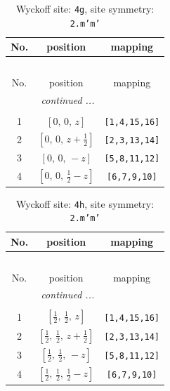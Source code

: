 \documentclass[fleqn,8pt]{jsarticle}
\begin{document}
\renewcommand{\arraystretch}{1.2}
\begin{longtable}{ccc}
\caption{Wyckoff site: {\tt 4g}, site symmetry: {\tt 2.m'm'}}
 \\
 \hline \hline
No. & position & mapping \\ \hline \endfirsthead

\multicolumn{2}{l}{\tablename\ \thetable{}} \\
 \hline \hline
No. & position & mapping \\ \hline \endhead

 \hline \hline
\multicolumn{2}{r}{\footnotesize\it continued ...} \\ \endfoot

 \hline \hline
\multicolumn{2}{r}{} \\ \endlastfoot

1 & $\left[ 0,\, 0,\, z \right]$ & {\tt [1,4,15,16]} \\ \hline
2 & $\left[ 0,\, 0,\, z + \frac{1}{2} \right]$ & {\tt [2,3,13,14]} \\ \hline
3 & $\left[ 0,\, 0,\, - z \right]$ & {\tt [5,8,11,12]} \\ \hline
4 & $\left[ 0,\, 0,\, \frac{1}{2} - z \right]$ & {\tt [6,7,9,10]} \\
\end{longtable}
\renewcommand{\arraystretch}{1.2}
\begin{longtable}{ccc}
\caption{Wyckoff site: {\tt 4h}, site symmetry: {\tt 2.m'm'}}
 \\
 \hline \hline
No. & position & mapping \\ \hline \endfirsthead

\multicolumn{2}{l}{\tablename\ \thetable{}} \\
 \hline \hline
No. & position & mapping \\ \hline \endhead

 \hline \hline
\multicolumn{2}{r}{\footnotesize\it continued ...} \\ \endfoot

 \hline \hline
\multicolumn{2}{r}{} \\ \endlastfoot

1 & $\left[ \frac{1}{2},\, \frac{1}{2},\, z \right]$ & {\tt [1,4,15,16]} \\ \hline
2 & $\left[ \frac{1}{2},\, \frac{1}{2},\, z + \frac{1}{2} \right]$ & {\tt [2,3,13,14]} \\ \hline
3 & $\left[ \frac{1}{2},\, \frac{1}{2},\, - z \right]$ & {\tt [5,8,11,12]} \\ \hline
4 & $\left[ \frac{1}{2},\, \frac{1}{2},\, \frac{1}{2} - z \right]$ & {\tt [6,7,9,10]} \\
\end{longtable}
\end{document}
